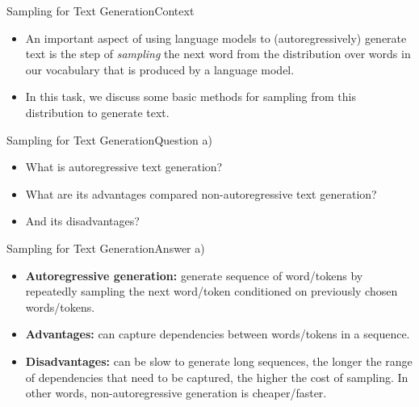 \documentclass[t]{beamer}
\begin{document}
\begin{frame}{Sampling for Text Generation}{Context}
    \begin{itemize}
        \item An important aspect of using language models to (autoregressively)
              generate text is the step of \emph{sampling} the next word from
              the distribution over words in our vocabulary that is produced by
              a language model.
        \item In this task, we discuss some basic methods for sampling from this
              distribution to generate text.
    \end{itemize}
\end{frame}

\begin{frame}{Sampling for Text Generation}{Question a)}
    \begin{itemize}
        \item What is autoregressive text generation?
        \item What are its advantages compared non-autoregressive text
              generation?
        \item And its disadvantages?
    \end{itemize}
\end{frame}

\begin{frame}{Sampling for Text Generation}{Answer a)}
    \begin{itemize}
        \item \textbf{Autoregressive generation:} generate sequence of
              word/tokens by repeatedly sampling the next word/token
              conditioned on previously chosen words/tokens.
              \pause
        \item \textbf{Advantages:} can capture dependencies between
              words/tokens in a sequence.
              \pause
        \item \textbf{Disadvantages:} can be slow to generate long
              sequences, the longer the range of dependencies that need
              to be captured, the higher the cost of sampling.
              In other words, non-autoregressive generation is
              cheaper/faster.
    \end{itemize}
\end{frame}
\end{document}

